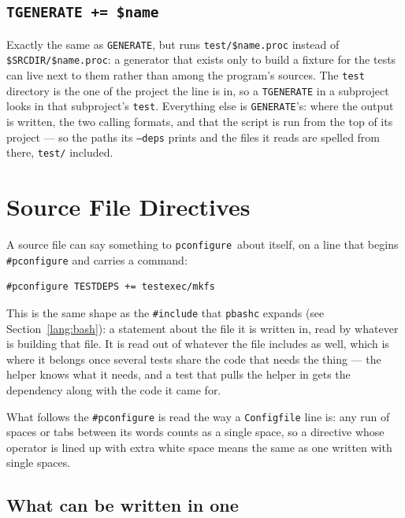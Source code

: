 \documentclass{article}
\newcommand{\pconfigure}{\texttt{pconfigure}}
\begin{document}
\subsection{\texttt{TGENERATE += \$name}}

Exactly the same as \texttt{GENERATE}, but runs
\texttt{test/\$name.proc} instead of \texttt{\$SRCDIR/\$name.proc}:
a generator that exists only to build a fixture for the tests can live
next to them rather than among the program's sources.  The
\texttt{test} directory is the one of the project the line is in, so a
\texttt{TGENERATE} in a subproject looks in that subproject's
\texttt{test}.  Everything else is \texttt{GENERATE}'s: where the output
is written, the two calling formats, and that the script is run from
the top of its project --- so the paths its \texttt{--deps} prints and
the files it reads are spelled from there, \texttt{test/} included.

\section{Source File Directives \label{directive}}

A source file can say something to \pconfigure\ about itself, on a
line that begins \texttt{\#pconfigure} and carries a command:

\begin{verbatim}
#pconfigure TESTDEPS += testexec/mkfs
\end{verbatim}

This is the same shape as the \texttt{\#include} that \texttt{pbashc}
expands (see Section~\ref{lang:bash}): a statement about the file it
is written in, read by whatever is building that file.  It is read out
of whatever the file includes as well, which is where it belongs once
several tests share the code that needs the thing --- the helper knows
what it needs, and a test that pulls the helper in gets the dependency
along with the code it came for.

What follows the \texttt{\#pconfigure} is read the way a
\texttt{Configfile} line is: any run of spaces or tabs between its
words counts as a single space, so a directive whose operator is lined
up with extra white space means the same as one written with single
spaces.

\subsection{What can be written in one}
\end{document}
